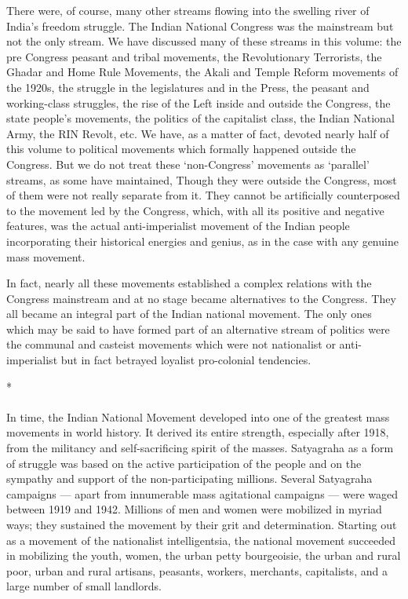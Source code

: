 There were, of course, many other streams flowing into the swelling river of India's freedom struggle. The Indian National Congress was the mainstream but not the only stream. We have discussed many of these streams in this volume: the pre­ Congress peasant and tribal movements, the Revolutionary Terrorists, the Ghadar and Home Rule Movements, the Akali and Temple Reform movements of the 1920s, the struggle in the legislatures and in the Press, the peasant and working-class struggles, the rise of the Left inside and outside the Congress, the state people's movements, the politics of the capitalist class, the Indian National Army, the RIN Revolt, etc. We have, as a matter of fact, devoted nearly half of this volume to political movements which formally happened outside the Congress. But we do not treat these `non-Congress' movements as `parallel' streams, as some have maintained, Though they were outside the Congress, most of them were not really separate from it. They cannot be artificially counterposed to the movement led by the Congress, which, with all its positive and negative features, was the actual anti-imperialist movement of the Indian people incorporating their historical energies and genius, as in the case with any genuine mass movement.

In fact, nearly all these movements established a complex relations with the Congress mainstream and at no stage became alternatives to the Congress. They all became an integral part of the Indian national movement. The only ones which may be said to have formed part of an alternative stream of politics were the communal and casteist movements which were not nationalist or anti-imperialist but in fact betrayed loyalist pro-colonial tendencies.

\begin{center}*\end{center}

\paragraph*{}
In time, the Indian National Movement developed into one of the greatest mass movements in world history. It derived its entire strength, especially after 1918, from the militancy and self-sacrificing spirit of the masses. Satyagraha as a form of struggle was based on the active participation of the people and on the sympathy and support of the non-participating millions. Several Satyagraha campaigns — apart from innumerable mass agitational campaigns — were waged between 1919 and 1942. Millions of men and women were mobilized in myriad ways; they sustained the movement by their grit and determination. Starting out as a movement of the nationalist intelligentsia, the national movement succeeded in mobilizing the youth, women, the urban petty bourgeoisie, the urban and rural poor, urban and rural artisans, peasants, workers, merchants, capitalists, and a large number of small landlords.


